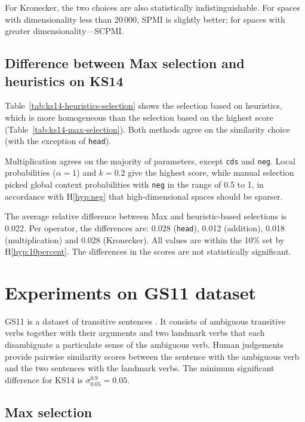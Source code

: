 For Kronecker, the two choices are also statistically indistinguishable. For spaces with dimensionality less than 20\,000, SPMI is slightly better; for spaces with greater dimensionality---SCPMI.

\subsection{Difference between Max selection and heuristics on KS14}

Table~\ref{tab:ks14-heuristics-selection} shows the selection based on heuristics, which is more homogeneous than the selection based on the highest score (Table~\ref{tab:ks14-max-selection}). Both methods agree on the similarity choice (with the exception of \texttt{head}).

Multiplication agrees on the majority of parameters, except \texttt{cds} and \texttt{neg}. Local probabilities ($\alpha = 1$) and $k = 0.2$ give the highest score, while manual selection picked global context probabilities with \texttt{neg} in the range of 0.5 to 1, in accordance with H\ref{hyp:neg} that high-dimensional spaces should be sparser.

The average relative difference between Max and heuristic-based selections is 0.022. Per operator, the differences are: 0.028 (\texttt{head}), 0.012 (addition), 0.018 (multiplication) and 0.028 (Kronecker). All values are within the 10\% set by H\ref{hyp:10percent}. The differences in the scores are not statistically significant.

\section{Experiments on GS11 dataset}
\label{sec:gs11}

GS11 is a dataset of transitive sentences \cite{Grefenstette:2011:ESC:2145432.2145580,Grefenstette:2011:ETV:2140490.2140497}. It consists of ambiguous transitive verbs together with their arguments and two landmark verbs that each disambiguate a particulate sense of the ambiguous verb. Human judgements provide pairwise similarity scores between the sentence with the ambiguous verb and the two sentences with the landmark verbs. The minimum significant difference for KS14 is $\sigma^{0.9}_{0.05} = 0.05$.

\subsection{Max selection}
\label{sec:max-selection-gs11}

